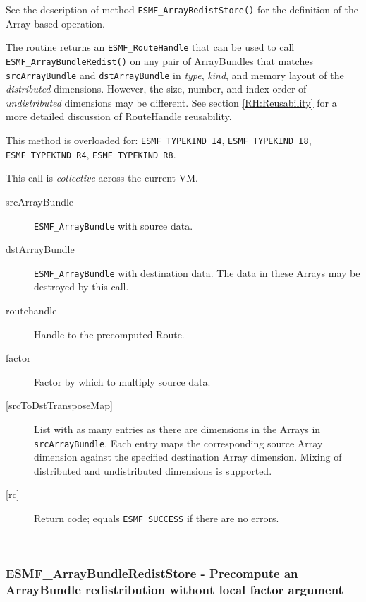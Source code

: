      See the description of method {\tt ESMF\_ArrayRedistStore()} for
     the definition of the Array based operation.
  
     The routine returns an {\tt ESMF\_RouteHandle} that can be used to call 
     {\tt ESMF\_ArrayBundleRedist()} on any pair of ArrayBundles that matches 
     {\tt srcArrayBundle} and {\tt dstArrayBundle} in {\em type}, {\em kind},
     and memory layout of the {\em distributed} dimensions. However, the size, 
     number, and index order of {\em undistributed} dimensions may be different.
     See section \ref{RH:Reusability} for a more detailed discussion of
     RouteHandle reusability.
  
     This method is overloaded for:\newline
     {\tt ESMF\_TYPEKIND\_I4}, {\tt ESMF\_TYPEKIND\_I8},\newline 
     {\tt ESMF\_TYPEKIND\_R4}, {\tt ESMF\_TYPEKIND\_R8}.
     \newline
  
     This call is {\em collective} across the current VM.
  
     \begin{description}
     \item [srcArrayBundle]
       {\tt ESMF\_ArrayBundle} with source data.
     \item [dstArrayBundle]
       {\tt ESMF\_ArrayBundle} with destination data. The data in these Arrays
       may be destroyed by this call.
     \item [routehandle]
       Handle to the precomputed Route.
     \item [factor]
       Factor by which to multiply source data.
     \item [{[srcToDstTransposeMap]}]
       List with as many entries as there are dimensions in the Arrays in
       {\tt srcArrayBundle}. Each
       entry maps the corresponding source Array dimension against the 
       specified destination Array dimension. Mixing of distributed and
       undistributed dimensions is supported.
     \item [{[rc]}]
       Return code; equals {\tt ESMF\_SUCCESS} if there are no errors.
     \end{description}
   
 
\mbox{}\hrulefill\ 
 
\subsubsection [ESMF\_ArrayBundleRedistStore] {ESMF\_ArrayBundleRedistStore - Precompute an ArrayBundle redistribution without local factor argument}


